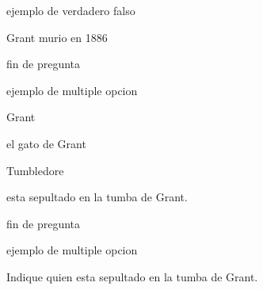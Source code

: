 \documentclass{gift}
\begin{document}
\begin{giftComentario}
  ejemplo  de  verdadero falso
\end  {giftComentario}
\begin{giftFragmento}
Grant murio en 1886\end  {giftFragmento}



\begin{giftFragmento}
\end  {giftFragmento}


\begin{giftComentario}
 fin de  pregunta
\end  {giftComentario}

\begin{giftComentario}
  ejemplo  de  multiple  opcion
\end  {giftComentario}
\begin{giftFragmento}
\end  {giftFragmento}


\begin{giftMO}
\item \begin{giftFragmento}
Grant\end  {giftFragmento}


\item \begin{giftFragmento}
el gato de  Grant\end  {giftFragmento}


\item \begin{giftFragmento}
Tumbledore\end  {giftFragmento}


\end  {giftMO}

\begin{giftFragmento}
esta sepultado  en la
tumba de  Grant.\end  {giftFragmento}


\begin{giftComentario}
 fin de  pregunta
\end  {giftComentario}

\begin{giftComentario}
  ejemplo  de  multiple  opcion
\end  {giftComentario}
\begin{giftFragmento}
Indique quien esta sepultado  en la  tumba de  Grant.\end  {giftFragmento}
\end{document}

